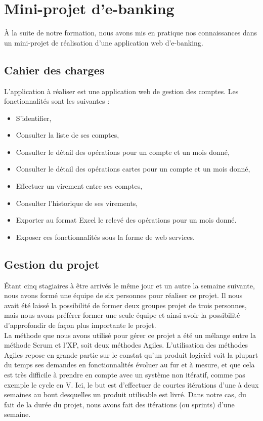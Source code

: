 \section{Mini-projet d'e-banking}

À la suite de notre formation, nous avons mis en pratique nos connaissances dans un mini-projet de réalisation d'une application web d'e-banking.

\subsection{Cahier des charges}

L'application à réaliser est une application web de gestion des comptes. Les fonctionnalités sont les suivantes :

\begin{itemize}
	\item S'identifier,
	\item Consulter la liste de ses comptes,
	\item Consulter le détail des opérations pour un compte et un mois donné,
	\item Consulter le détail des opérations cartes pour un compte et un mois donné,
	\item Effectuer un virement entre ses comptes,
	\item Consulter l'historique de ses virements,
	\item Exporter au format Excel le relevé des opérations pour un mois donné.
	\item Exposer ces fonctionnalités sous la forme de web services.
\end{itemize}

\subsection{Gestion du projet}

Étant cinq stagiaires à être arrivés le même jour et un autre la semaine suivante, nous avons formé une équipe de six personnes pour réaliser ce projet. Il nous avait été laissé la possibilité de former deux groupes projet de trois personnes, mais nous avons préférer former une seule équipe et ainsi avoir la possibilité d'approfondir de façon plus importante le projet.\\

La méthode que nous avons utilisé pour gérer ce projet a été un mélange entre la méthode Scrum et l'XP, soit deux méthodes Agiles. L'utilisation des méthodes Agiles repose en grande partie sur le constat qu'un produit logiciel voit la plupart du temps ses demandes en fonctionnalités évoluer au fur et à mesure, et que cela est très difficile à prendre en compte avec un  système non itératif, comme pas exemple le cycle en V. Ici, le but est d'effectuer de courtes itérations d'une à deux semaines au bout desquelles un produit utilisable est livré. Dans notre cas, du fait de la durée du projet, nous avons fait des itérations (ou sprints) d'une semaine.\\

